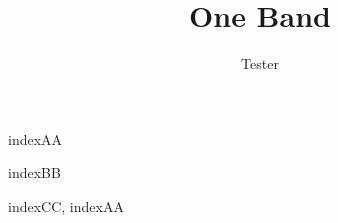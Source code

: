 \documentclass[chorded]{velkyzpevnik}
\title{One Band}
\author{Tester}
\begin{document}
{
	\large {}
}

\begin{songs}{indexAA}\newpage
	
\end{songs}

\begin{songs}{indexBB}
\end{songs}

\pagebreak
\begin{songs}{indexCC, indexAA}
    
	
\end{songs}
\end{document}
